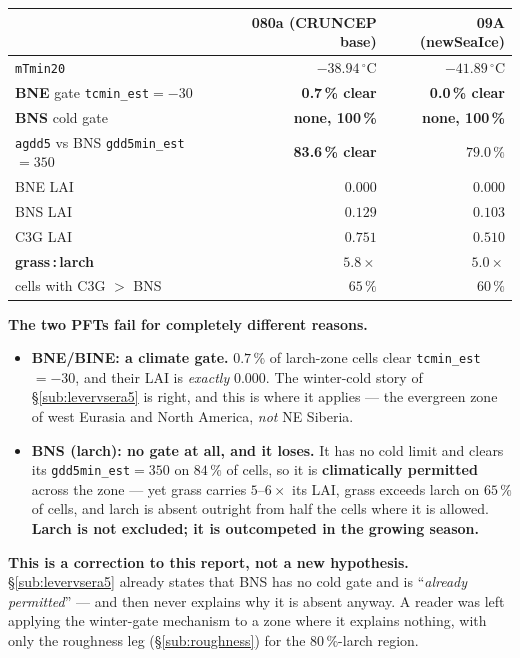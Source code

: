 \documentclass[10pt]{article}
\begin{document}
\begin{center}\footnotesize
\begin{tabular}{l r r}
\toprule
 & 080a (CRUNCEP base) & 09A (newSeaIce) \\
\midrule
\texttt{mTmin20} & $-38.94\,^\circ$C & $-41.89\,^\circ$C \\
\textbf{BNE} gate \texttt{tcmin\_est}$=-30$ & \textbf{0.7\,\% clear} & \textbf{0.0\,\% clear} \\
\textbf{BNS} cold gate & \textbf{none, 100\,\%} & \textbf{none, 100\,\%} \\
\texttt{agdd5} vs BNS \texttt{gdd5min\_est}$=350$ & \textbf{83.6\,\% clear} & $79.0\,\%$ \\
\midrule
BNE LAI & $\mathbf{0.000}$ & $\mathbf{0.000}$ \\
BNS LAI & $0.129$ & $0.103$ \\
C3G LAI & $0.751$ & $0.510$ \\
\textbf{grass\,:\,larch} & $\mathbf{5.8\times}$ & $5.0\times$ \\
cells with C3G $>$ BNS & $65\,\%$ & $60\,\%$ \\
\bottomrule
\end{tabular}
\end{center}

\noindent \textbf{The two PFTs fail for completely different reasons.}

\begin{itemize}\itemsep2pt
\item \textbf{BNE/BINE: a climate gate.} $0.7\,\%$ of larch-zone cells clear
  \texttt{tcmin\_est}$=-30$, and their LAI is \emph{exactly} $0.000$. The winter-cold story of
  \S\ref{sub:levervsera5} is right, and this is where it applies --- the evergreen zone of
  west Eurasia and North America, \emph{not} NE Siberia.
\item \textbf{BNS (larch): no gate at all, and it loses.} It has no cold limit and clears its
  \texttt{gdd5min\_est}$=350$ on $84\,\%$ of cells, so it is \textbf{climatically permitted}
  across the zone --- yet grass carries $5$--$6\times$ its LAI, grass exceeds larch on
  $65\,\%$ of cells, and larch is absent outright from half the cells where it is allowed.
  \textbf{Larch is not excluded; it is outcompeted in the growing season.}
\end{itemize}

\textbf{This is a correction to this report, not a new hypothesis.} \S\ref{sub:levervsera5}
already states that BNS has no cold gate and is ``\emph{already permitted}'' --- and then never
explains why it is absent anyway. A reader was left applying the winter-gate mechanism to a
zone where it explains nothing, with only the roughness leg (\S\ref{sub:roughness}) for the
$80\,\%$-larch region.
\end{document}
